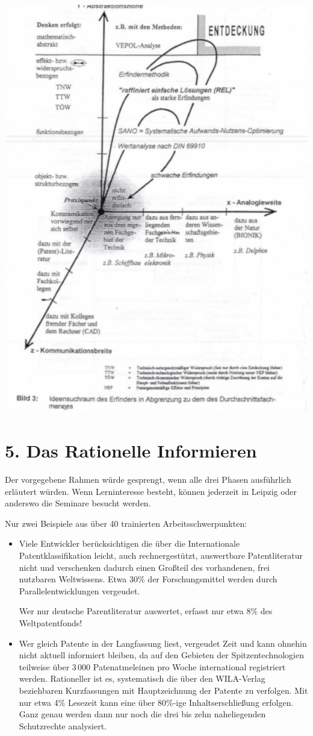\documentclass[11pt,a4paper]{article}
\begin{document}
\begin{center}
  \includegraphics[width=.9\textwidth]{HF-A.pdf}
\end{center}
\newpage

\section*{5. Das Rationelle Informieren}

Der vorgegebene Rahmen würde gesprengt, wenn alle drei Phasen ausführlich
erläutert wür\-den.  Wenn Lerninteresse besteht, können jederzeit in Leipzig
oder anderswo die Seminare besucht werden.

Nur zwei Beispiele aus über 40 trainierten Arbeitsschwerpunkten:
\begin{itemize}
\item Viele Entwickler berücksichtigen die über die Internationale
  Patentklassifikation leicht, auch rechnergestützt, auswertbare
  Patentliteratur nicht und verschenken dadurch einen Großteil des
  vorhandenen, frei nutzbaren Weltwissens. Etwa 30\% der Forschungsmittel
  werden durch Parallelentwicklungen vergeudet.

  Wer nur deutsche Parentliteratur auswertet, erfasst nur etwa 8\% des
  Weltpatentfonds!
\item Wer gleich Patente in der Langfassung liest, vergeudet Zeit und kann
  ohnehin nicht aktuell informiert bleiben, da auf den Gebieten der
  Spitzentechnologien teilweise über 3\,000 Patenatmeleinen pro Woche
  international registriert werden. Rationeller ist es, systematisch die über
  den WILA-Verlag beziehbaren Kurzfassungen mit Hauptzeichnung der Patente zu
  verfolgen. Mit nur etwa 4\% Lesezeit kann eine über 80\%-ige
  Inhaltserschließung erfolgen. Ganz genau werden dann nur noch die drei bis
  zehn naheliegenden Schutzrechte analysiert.
\end{itemize}
\end{document}

